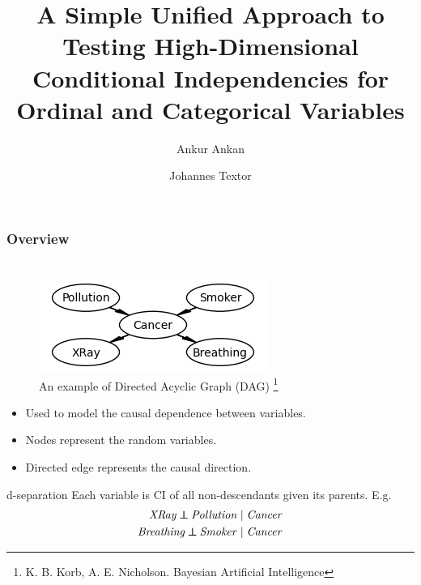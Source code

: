 \documentclass{beamer}
\def\ci{\perp\!\!\!\!\!\perp}
\begin{document}
\title[High-Dimensional CI testing for Ordinal and Categorical Variables]{A Simple Unified Approach to Testing High-Dimensional Conditional Independencies for Ordinal and Categorical Variables}
\author {Ankur Ankan \and Johannes Textor}
\date{}
\maketitle

\begin{frame}
	\frametitle{Overview}
	\tableofcontents
\end{frame}

\section{}
\begin{frame}
	\frametitle{}
	\begin{figure}
		\centering
		\includegraphics[scale=0.6]{imgs/example_dag.png}
		\caption*{An example of Directed Acyclic Graph (DAG) \footnote{K. B. Korb, A. E. Nicholson. Bayesian Artificial Intelligence}}
	\end{figure}
	\begin{itemize}
		\item Used to model the causal dependence between variables.
		\item Nodes represent the random variables.
		\item Directed edge represents the causal direction.
	\end{itemize}

	\begin{block}{d-separation}
	Each variable is CI of all non-descendants given its parents. E.g.
		\begin{equation*}
			\begin{split}
				\text{\emph{XRay}} \ci \text{\emph{Pollution}} \mid \text{\emph{Cancer}} \\
				\text{\emph{Breathing}} \ci \text{\emph{Smoker}} \mid \text{\emph{Cancer}}
			\end{split}
		\end{equation*}
	\end{block}
\end{frame}
\end{document}
